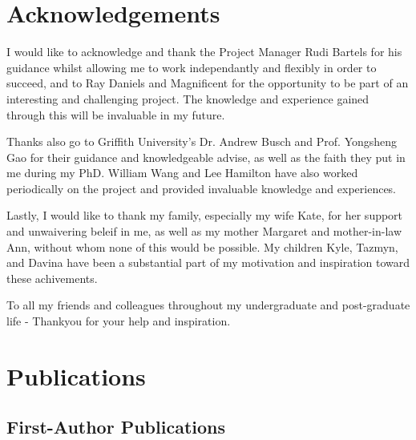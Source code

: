 \documentclass[fleqn,twoside]{article}
\begin{document}
\section*{Acknowledgements}


I would like to acknowledge and thank the Project Manager Rudi Bartels for his guidance whilst allowing me to work independantly and flexibly in order to succeed, and to Ray Daniels and Magnificent for the opportunity to be part of an interesting and challenging project. The knowledge and experience gained through this will be invaluable in my future.

Thanks also go to Griffith University's Dr. Andrew Busch and Prof. Yongsheng Gao for their guidance and knowledgeable advise, as well as the faith they put in me during my PhD. William Wang and Lee Hamilton have also worked periodically on the project and provided invaluable knowledge and experiences.

Lastly, I would like to thank my family, especially my wife Kate, for her support and unwaivering beleif in me, as well as my mother Margaret and mother-in-law Ann, without whom none of this would be possible. My children Kyle, Tazmyn, and Davina have been a substantial part of my motivation and inspiration toward these achivements.

To all my friends and colleagues throughout my undergraduate and post-graduate life - Thankyou for your help and inspiration.

\vspace*{\fill}%



\newpage

\section*{Publications}


\subsection{First-Author Publications}
\end{document}
